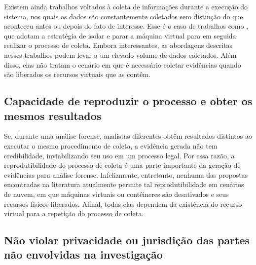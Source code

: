 Existem ainda trabalhos voltados à coleta de informações durante a execução do sistema, nos quais os dados são constantemente coletados sem distinção do que aconteceu antes ou depois do fato de interesse.
%
Esse é o caso de trabalhos como \cite{PoiselVMI:2013,DykstraFROST:2013,SangLogApproach:2013,Dolan-GavittSemanticGap:2011}, que adotam a estratégia de isolar e parar a máquina virtual para em seguida realizar o processo de coleta. 
%
Embora interessantes, as abordagens descritas nesses trabalhos podem levar a um elevado volume de dados coletados.
%
Além disso, elas não tratam o cenário em que é necessário coletar evidências quando são liberados os recursos virtuais que as contêm.


\subsection{Capacidade de reproduzir o processo e obter os mesmos resultados}
\label{sec:reprodutibilidade}

Se, durante uma análise forense, analistas diferentes obtêm resultados distintos ao executar o mesmo procedimento de coleta, a evidência gerada não tem credibilidade, inviabilizando seu uso em um processo legal. 
%
Por essa razão, a reprodutibilidade do processo de coleta é uma parte importante da geração de evidências para análise forense.
%
Infelizmente, entretanto, nenhuma das propostas encontradas na literatura atualmente permite tal reprodutibilidade em cenários de nuvem, em que máquinas virtuais ou contêineres são desativados e seus recursos físicos liberados.
%
Afinal, todas elas dependem da existência do recurso virtual para a repetição do processo de coleta.

\subsection{Não violar privacidade ou jurisdição das partes não envolvidas na investigação}
\label{sec:legais}

